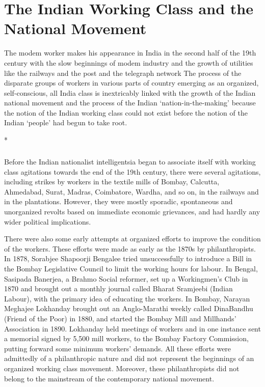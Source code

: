 \chapter[The Indian Working Class and National Movement]{The Indian Working Class and the National Movement}



The modem worker makes his appearance in India in the second half of the 19th century with the slow beginnings of modem industry and the growth of utilities like the railways and the post and the telegraph network The process of the disparate groups of workers in various parts of country emerging as an organized, self-conscious, all India class is inextricably linked with the growth of the Indian national movement and the process of the Indian `nation-in-the-making' because the notion of the Indian working class could not exist before the notion of the Indian `people' had begun to take root.

\begin{center}*\end{center}

\paragraph*{}


Before the Indian nationalist intelligentsia began to associate itself with working class agitations towards the end of the 19th century, there were several agitations, including strikes by workers in the textile mills of Bombay, Calcutta, Ahmedabad, Surat, Madras, Coimbatore, Wardha, and so on, in the railways and in the plantations. However, they were mostly sporadic, spontaneous and unorganized revolts based on immediate economic grievances, and had hardly any wider political implications.

There were also some early attempts at organized efforts to improve the condition of the workers. These efforts were made as early as the 1870s by philanthropists. In 1878, Sorabjee Shapoorji Bengalee tried unsuccessfully to introduce a Bill in the Bombay Legislative Council to limit the working hours for labour. In Bengal, Sasipada Banerjea, a Brahmo Social reformer, set up a Workingmen's Club in 1870 and brought out a monthly journal called Bharat Sramjeebi (Indian Labour), with the primary idea of educating the workers. In Bombay, Narayan Meghajee Lokhanday brought out an Anglo-Marathi weekly called DinaBandhu (Friend of the Poor) in 1880, and started the Bombay Mill and Millhands' Association in 1890. Lokhanday held meetings of workers and in one instance sent a memorial signed by 5,500 mill workers, to the Bombay Factory Commission, putting forward some minimum workers' demands. All these efforts were admittedly of a philanthropic nature and did not represent the beginnings of an organized working class movement. Moreover, these philanthropists did not belong to the mainstream of the contemporary national movement.

